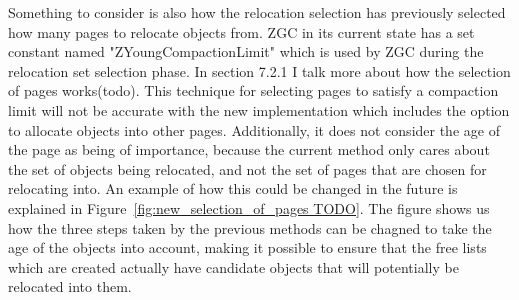 Something to consider is also how the relocation selection has previously selected how many pages to relocate objects from. ZGC in its current state has a set constant named "ZYoungCompactionLimit" which is used by ZGC during the relocation set selection phase. In section 7.2.1 I talk more about how the selection of pages works(todo). This technique for selecting pages to satisfy a compaction limit will not be accurate with the new implementation which includes the option to allocate objects into other pages. Additionally, it does not consider the age of the page as being of importance, because the current method only cares about the set of objects being relocated, and not the set of pages that are chosen for relocating into. An example of how this could be changed in the future is explained in Figure~\ref{fig:new_selection_of_pages TODO}. The figure shows us how the three steps taken by the previous methods can be chagned to take the age of the objects into account, making it possible to ensure that the free lists which are created actually have candidate objects that will potentially be relocated into them. 

